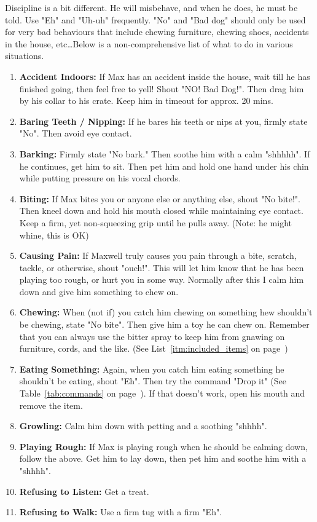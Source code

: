 \documentclass[pdftex,12pt]{article}
\begin{document}
\bigskip

Discipline is a bit different. He will misbehave, and when he does, he must be
told. Use "Eh" and "Uh-uh" frequently. "No" and "Bad dog" should only be used
for very bad behaviours that include chewing furniture, chewing shoes, accidents
in the house, etc\ldots Below is a non-comprehensive list of what to do in
various situations.

\bigskip

\begin{enumerate}\label{itm:discipline}
    \item \textbf{Accident Indoors:} If Max has an accident inside the house,
        wait till he has finished going, then feel free to yell! Shout "NO!
        Bad Dog!". Then drag him by his collar to his crate. Keep him in
        timeout for approx. 20 mins.
    \item \textbf{Baring Teeth / Nipping:} If he bares his teeth or nips at you,
        firmly state "No". Then avoid eye contact.
    \item \textbf{Barking:} Firmly state "No bark." Then soothe him with a calm
        "shhhhh". If he continues, get him to sit. Then pet him and hold one
        hand under his chin while putting pressure on his vocal chords.
    \item \textbf{Biting:} If Max bites you or anyone else or anything else,
        shout "No bite!". Then kneel down and hold his mouth closed while
        maintaining eye contact. Keep a firm, yet non-squeezing grip until he
        pulls away. (Note: he might whine, this is OK)
    \item \textbf{Causing Pain:} If Maxwell truly causes you pain through a
        bite, scratch, tackle, or otherwise, shout "ouch!". This will let
        him know that he has been playing too rough, or hurt you in some way.
        Normally after this I calm him down and give him something to chew on.
    \item \textbf{Chewing:} When (not if) you catch him chewing on something hew
        shouldn't be chewing, state "No bite". Then give him a toy he can chew
        on. Remember that you can always use the bitter spray to keep him from
        gnawing on furniture, cords, and the like. (See List~\ref{itm:included_items} on
        page~\pageref{itm:included_items})
    \item \textbf{Eating Something:} Again, when you catch him eating something
        he shouldn't be eating, shout "Eh". Then try the command "Drop it" (See
        Table~\ref{tab:commands} on page~\pageref{tab:commands}). If that
        doesn't work, open his mouth and remove the item.
    \item \textbf{Growling:} Calm him down with petting and a soothing "shhhh".
    \item \textbf{Playing Rough:} If Max is playing rough when he should be
        calming down, follow the above. Get him to lay down, then pet him and
        soothe him with a "shhhh".
    \item \textbf{Refusing to Listen:} Get a treat.
    \item \textbf{Refusing to Walk:} Use a firm tug with a firm "Eh".
\end{enumerate}
\end{document}
